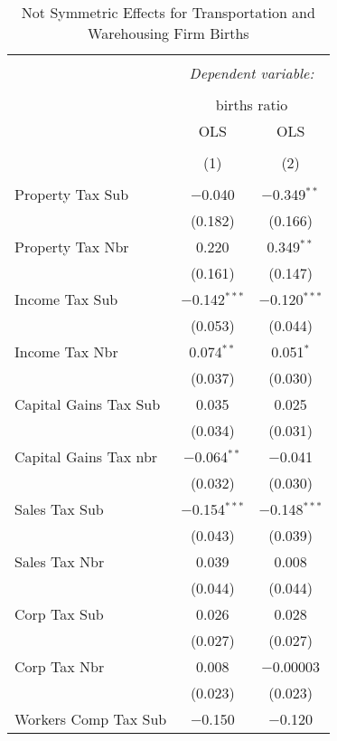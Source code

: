 
\begin{table}[!htbp] \centering 
  \caption{Not Symmetric Effects for  Transportation and Warehousing Firm Births} 
  \label{48-49noequality} 
\begin{tabular}{@{\extracolsep{5pt}}lcc} 
\\[-1.8ex]\hline 
\hline \\[-1.8ex] 
 & \multicolumn{2}{c}{\textit{Dependent variable:}} \\ 
\cline{2-3} 
\\[-1.8ex] & \multicolumn{2}{c}{births ratio} \\ 
 & OLS & OLS \\ 
\\[-1.8ex] & (1) & (2)\\ 
\hline \\[-1.8ex] 
 Property Tax Sub & $-$0.040 & $-$0.349$^{**}$ \\ 
  & (0.182) & (0.166) \\ 
  Property Tax Nbr & 0.220 & 0.349$^{**}$ \\ 
  & (0.161) & (0.147) \\ 
  Income Tax Sub & $-$0.142$^{***}$ & $-$0.120$^{***}$ \\ 
  & (0.053) & (0.044) \\ 
  Income Tax Nbr & 0.074$^{**}$ & 0.051$^{*}$ \\ 
  & (0.037) & (0.030) \\ 
  Capital Gains Tax Sub & 0.035 & 0.025 \\ 
  & (0.034) & (0.031) \\ 
  Capital Gains Tax nbr & $-$0.064$^{**}$ & $-$0.041 \\ 
  & (0.032) & (0.030) \\ 
  Sales Tax Sub & $-$0.154$^{***}$ & $-$0.148$^{***}$ \\ 
  & (0.043) & (0.039) \\ 
  Sales Tax Nbr & 0.039 & 0.008 \\ 
  & (0.044) & (0.044) \\ 
  Corp Tax Sub & 0.026 & 0.028 \\ 
  & (0.027) & (0.027) \\ 
  Corp Tax Nbr & 0.008 & $-$0.00003 \\ 
  & (0.023) & (0.023) \\ 
  Workers Comp Tax Sub & $-$0.150 & $-$0.120 \\ 

\end{tabular}
\end{table}
